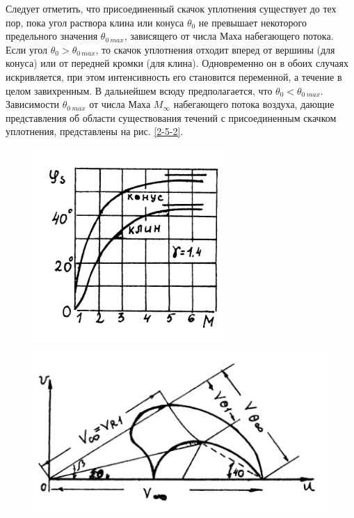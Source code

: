 \documentclass[specialist, subf, href, colorlinks=true, 14pt, final]{disser}
\theoremstyle{definition}
\begin{document}
Следует отметить, что присоединенный скачок уплотнения существует до тех пор, пока угол раствора клина или конуса $\theta_0$ не превышает некоторого предельного значения $\theta_{0\ max}$, зависящего от числа Маха набегающего потока. Если угол $\theta_0 > \theta_{0\ max}$, то скачок уплотнения отходит вперед от вершины (для конуса) или от передней кромки (для клина). Одновременно он в обоих случаях искривляется, при этом интенсивность его становится переменной, а течение в целом завихренным. В дальнейшем всюду предполагается, что $\theta_0 < \theta_{0\ max}$. Зависимости $\theta_{0\ max}$ от числа Маха $M_{\infty}$ набегающего потока воздуха, дающие представления об области существования течений с присоединенным скачком уплотнения, представлены на рис. \ref{2-5-2}.
\begin{figure}[h]
\begin{center}
\begin{minipage}[h]{0.35\linewidth}
\includegraphics[width=1\linewidth]{pics/2-5-2.png}
\caption{}
\label{2-5-2}
\end{minipage}
\hfill
\begin{minipage}[h]{0.6\linewidth}
\includegraphics[width=1\linewidth]{pics/2-5-3.png}
\caption{}
\label{2-5-3}
\end{minipage}
\end{center}
\end{figure}
\end{document}
